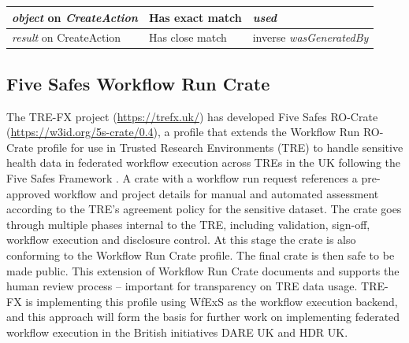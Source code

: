 \documentclass[10pt,letterpaper]{article}
\begin{document}
\begin{table}[!ht]
\begin{adjustwidth}{-1.5cm}{0in}
\begin{tabular}{p{35mm}|p{40mm}|p{40mm}}
  \emph{object} on \emph{CreateAction} &
    Has exact match & 
    \emph{used} 
    \\ \hline
  \emph{result} on CreateAction & 
    Has close match & 
    inverse \emph{wasGeneratedBy} 
  
  \end{tabular}
  \label{rocrate_prov_mapping}
  \end{adjustwidth}
\end{table}
  

\subsection{Five Safes Workflow Run Crate}\label{trusted-workflow-run-crate}

The TRE-FX project (\url{https://trefx.uk/}) has developed Five Safes RO-Crate (\url{https://w3id.org/5s-crate/0.4}), a profile that extends the Workflow Run RO- Crate profile for use in Trusted Research Environments (TRE) to handle sensitive health data in federated workflow execution across TREs in the UK following the Five Safes Framework \cite{Desai 2016}.
A crate with a workflow run request references a pre-approved workflow and project details for manual and automated assessment according to the TRE's agreement policy for the sensitive dataset. 
The crate goes through multiple phases internal to the TRE, including validation, sign-off, workflow execution and disclosure control.
At this stage the crate is also conforming to the Workflow Run Crate profile.
The final crate is then safe to be made public.
This extension of Workflow Run Crate documents and supports the human review process -- important for transparency on TRE data usage. 
TRE-FX is implementing this profile using WfExS as the workflow execution backend, and this approach will form the basis for further work on implementing federated workflow execution in the British initiatives DARE UK and HDR UK.    
\end{document}
